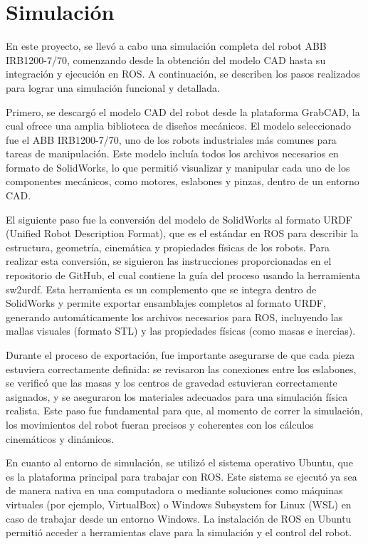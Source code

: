 \section{Simulación} \label{sec:simulacion}
En este proyecto, se llevó a cabo una simulación completa del robot ABB IRB1200-7/70, comenzando desde la obtención del modelo CAD hasta su integración y ejecución en ROS. A continuación, se describen los pasos realizados para lograr una simulación funcional y detallada.

Primero, se descargó el modelo CAD del robot desde la plataforma GrabCAD, la cual ofrece una amplia biblioteca de diseños mecánicos. El modelo seleccionado fue el ABB IRB1200-7/70, uno de los robots industriales más comunes para tareas de manipulación. Este modelo incluía todos los archivos necesarios en formato de SolidWorks, lo que permitió visualizar y manipular cada uno de los componentes mecánicos, como motores, eslabones y pinzas, dentro de un entorno CAD.

El siguiente paso fue la conversión del modelo de SolidWorks al formato URDF (Unified Robot Description Format), que es el estándar en ROS para describir la estructura, geometría, cinemática y propiedades físicas de los robots. Para realizar esta conversión, se siguieron las instrucciones proporcionadas en el repositorio de GitHub, el cual contiene la guía del proceso usando la herramienta sw2urdf. Esta herramienta es un complemento que se integra dentro de SolidWorks y permite exportar ensamblajes completos al formato URDF, generando automáticamente los archivos necesarios para ROS, incluyendo las mallas visuales (formato STL) y las propiedades físicas (como masas e inercias).


Durante el proceso de exportación, fue importante asegurarse de que cada pieza estuviera correctamente definida: se revisaron las conexiones entre los eslabones, se verificó que las masas y los centros de gravedad estuvieran correctamente asignados, y se aseguraron los materiales adecuados para una simulación física realista. Este paso fue fundamental para que, al momento de correr la simulación, los movimientos del robot fueran precisos y coherentes con los cálculos cinemáticos y dinámicos.

En cuanto al entorno de simulación, se utilizó el sistema operativo Ubuntu, que es la plataforma principal para trabajar con ROS. Este sistema se ejecutó ya sea de manera nativa en una computadora o mediante soluciones como máquinas virtuales (por ejemplo, VirtualBox) o Windows Subsystem for Linux (WSL) en caso de trabajar desde un entorno Windows. La instalación de ROS en Ubuntu permitió acceder a herramientas clave para la simulación y el control del robot.

